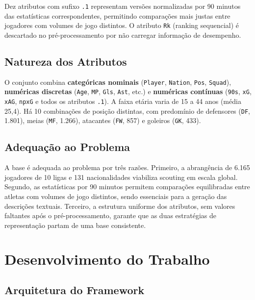 \documentclass[portuguese]{sbc2025}
\begin{document}
Dez atributos com sufixo \texttt{.1} representam versões normalizadas por 90 minutos
das estatísticas correspondentes, permitindo comparações mais justas entre jogadores
com volumes de jogo distintos. O atributo \texttt{Rk} (ranking sequencial) é
descartado no pré-processamento por não carregar informação de desempenho.

\subsection{Natureza dos Atributos}

O conjunto combina \textbf{categóricas nominais} (\texttt{Player}, \texttt{Nation},
\texttt{Pos}, \texttt{Squad}), \textbf{numéricas discretas} (\texttt{Age}, \texttt{MP},
\texttt{Gls}, \texttt{Ast}, etc.) e \textbf{numéricas contínuas} (\texttt{90s},
\texttt{xG}, \texttt{xAG}, \texttt{npxG} e todos os atributos \texttt{.1}). A faixa
etária varia de 15 a 44 anos (média 25,4). Há 10 combinações de posição distintas,
com predomínio de defensores (\texttt{DF}, 1.801), meias (\texttt{MF}, 1.266),
atacantes (\texttt{FW}, 857) e goleiros (\texttt{GK}, 433).

\subsection{Adequação ao Problema}

A base é adequada ao problema por três razões. Primeiro, a abrangência de 6.165
jogadores de 10 ligas e 131 nacionalidades viabiliza scouting em escala global. Segundo,
as estatísticas por 90 minutos permitem comparações equilibradas entre atletas com
volumes de jogo distintos, sendo essenciais para a geração das descrições textuais.
Terceiro, a estrutura uniforme dos atributos, sem valores faltantes após o
pré-processamento, garante que as duas estratégias de representação partam de uma
base consistente.


\section{Desenvolvimento do Trabalho}
\label{sec:dev}

\subsection{Arquitetura do Framework}
\end{document}
